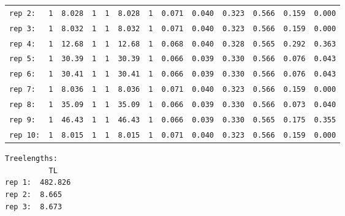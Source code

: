 \begin{refsection}
\begin{table}[H]
\begin{tabular}{lcccccccccccc}
\texttt{rep 2:} & \texttt{1} & \texttt{8.028} & \texttt{1} & \texttt{1} & \texttt{8.028} & \texttt{1} & \texttt{0.071} & \texttt{0.040} & \texttt{0.323} & \texttt{0.566} & \texttt{0.159} & \texttt{0.000}\\
\texttt{rep 3:} & \texttt{1} & \texttt{8.032} & \texttt{1} & \texttt{1} & \texttt{8.032} & \texttt{1} & \texttt{0.071} & \texttt{0.040} & \texttt{0.323} & \texttt{0.566} & \texttt{0.159} & \texttt{0.000}\\
\texttt{rep 4:} & \texttt{1} & \texttt{12.68} & \texttt{1} & \texttt{1} & \texttt{12.68} & \texttt{1} & \texttt{0.068} & \texttt{0.040} & \texttt{0.328} & \texttt{0.565} & \texttt{0.292} & \texttt{0.363}\\
\texttt{rep 5:} & \texttt{1} & \texttt{30.39} & \texttt{1} & \texttt{1} & \texttt{30.39} & \texttt{1} & \texttt{0.066} & \texttt{0.039} & \texttt{0.330} & \texttt{0.566} & \texttt{0.076} & \texttt{0.043}\\
\texttt{rep 6:} & \texttt{1} & \texttt{30.41} & \texttt{1} & \texttt{1} & \texttt{30.41} & \texttt{1} & \texttt{0.066} & \texttt{0.039} & \texttt{0.330} & \texttt{0.566} & \texttt{0.076} & \texttt{0.043}\\
\texttt{rep 7:} & \texttt{1} & \texttt{8.036} & \texttt{1} & \texttt{1} & \texttt{8.036} & \texttt{1} & \texttt{0.071} & \texttt{0.040} & \texttt{0.323} & \texttt{0.566} & \texttt{0.159} & \texttt{0.000}\\
\texttt{rep 8:} & \texttt{1} & \texttt{35.09} & \texttt{1} & \texttt{1} & \texttt{35.09} & \texttt{1} & \texttt{0.066} & \texttt{0.039} & \texttt{0.330} & \texttt{0.566} & \texttt{0.073} & \texttt{0.040}\\
\texttt{rep 9:} & \texttt{1} & \texttt{46.43} & \texttt{1} & \texttt{1} & \texttt{46.43} & \texttt{1} & \texttt{0.066} & \texttt{0.039} & \texttt{0.330} & \texttt{0.565} & \texttt{0.175} & \texttt{0.355}\\
\texttt{rep 10:} & \texttt{1} & \texttt{8.015} & \texttt{1} & \texttt{1} & \texttt{8.015} & \texttt{1} & \texttt{0.071} & \texttt{0.040} & \texttt{0.323} & \texttt{0.566} & \texttt{0.159} & \texttt{0.000}\\
\end{tabular}
\end{table}
\texttt{Treelengths:}\\
\texttt{~~~~~~~~~~TL~}\\
\texttt{rep~1:~~482.826}\\
\texttt{rep~2:~~8.665}\\
\texttt{rep~3:~~8.673}\\

\end{refsection}
